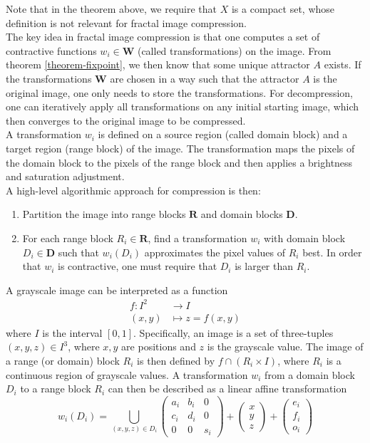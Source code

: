 Note that in the theorem above, we require that $X$ is a compact set, whose definition is not relevant for fractal image compression.
\\
The key idea in fractal image compression is that one computes a set of contractive functions $w_i \in \boldsymbol{W}$ (called transformations) on the image.
From theorem \ref{theorem-fixpoint}, we then know that some unique attractor $A$ exists. If the transformations $\boldsymbol{W}$ are chosen in a way such that the attractor $A$ is the original image,
one only needs to store the transformations. For decompression, one can iteratively apply all transformations on any initial starting image, which then converges to the original image to be compressed.\\
A transformation $w_i$ is defined on a source region (called domain block) and a target region (range block) of the image. 
The transformation maps the pixels of the domain block to the pixels of the range block and then applies a brightness and saturation adjustment.\\
A high-level algorithmic approach for compression is then:
\begin{enumerate}
    \item Partition the image into range blocks $\boldsymbol{R}$ and domain blocks $\boldsymbol{D}$.
    \item For each range block $R_i \in \boldsymbol{R}$, find a transformation $w_i$ with domain block $D_i \in \boldsymbol{D}$ 
            such that $w_i(D_i)$ approximates the pixel values of $R_i$ best. In order that $w_i$ is contractive, one must require that $D_i$ is larger than $R_i$.
\end{enumerate}
A grayscale image can be interpreted as a function
\begin{align*}
    f \colon I^2 &\to I\\
    (x,y) &\mapsto z = f(x,y)
\end{align*}
where $I$ is the interval $[0,1]$. Specifically, an image is a set of three-tuples $(x,y,z) \in I^3$, where $x,y$ are positions and $z$ is the grayscale value.
The image of a range (or domain) block $R_i$ is then defined by $f \cap (R_i \times I)$, where $R_i$ is a continuous region of grayscale values. 
A transformation $w_i$ from a domain block $D_i$ to a range block $R_i$ can then be described as a linear affine transformation
$$
w_i(D_i) = \bigcup_{(x,y,z) \in D_i} \begin{pmatrix} a_i & b_i & 0 \\ c_i & d_i & 0 \\ 0 & 0 & s_i \end{pmatrix} + \begin{pmatrix} x\\y\\z \end{pmatrix} + \begin{pmatrix} e_i\\f_i\\o_i \end{pmatrix}
$$
